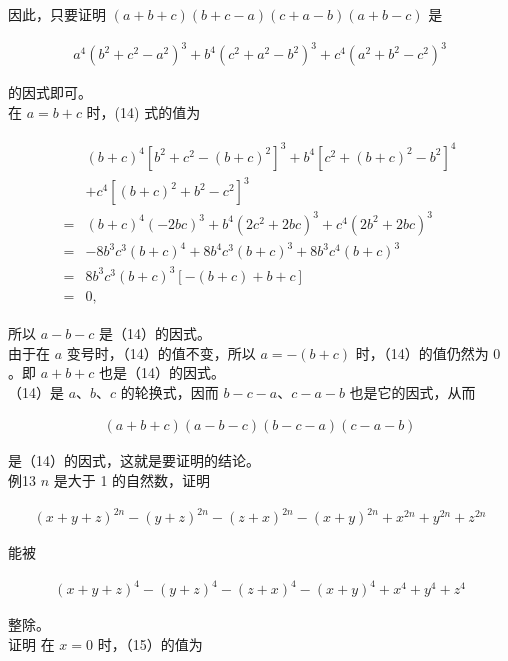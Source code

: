 \documentclass[10pt]{article}
\begin{document}
因此，只要证明 $(a+b+c)(b+c-a)(c+a-b)(a+b-c)$ 是

\begin{align*}
a^{4}\left(b^{2}+c^{2}-a^{2}\right)^{3}+b^{4}\left(c^{2}+a^{2}-b^{2}\right)^{3}+c^{4}\left(a^{2}+b^{2}-c^{2}\right)^{3} \tag{14}
\end{align*}

的因式即可。\\
在 $a=b+c$ 时，(14) 式的值为

\begin{align*}
\begin{aligned}
& (b+c)^{4}\left[b^{2}+c^{2}-(b+c)^{2}\right]^{3}+b^{4}\left[c^{2}+(b+c)^{2}-b^{2}\right]^{4} \\
& +c^{4}\left[(b+c)^{2}+b^{2}-c^{2}\right]^{3} \\
= & (b+c)^{4}(-2 b c)^{3}+b^{4}\left(2 c^{2}+2 b c\right)^{3}+c^{4}\left(2 b^{2}+2 b c\right)^{3} \\
= & -8 b^{3} c^{3}(b+c)^{4}+8 b^{4} c^{3}(b+c)^{3}+8 b^{3} c^{4}(b+c)^{3} \\
= & 8 b^{3} c^{3}(b+c)^{3}[-(b+c)+b+c] \\
= & 0,
\end{aligned}
\end{align*}

所以 $a-b-c$ 是（14）的因式。\\
由于在 $a$ 变号时，（14）的值不变，所以 $a=-(b+c)$ 时，（14）的值仍然为 0 。即 $a+b+c$ 也是（14）的因式。\\
（14）是 $a 、 b 、 c$ 的轮换式，因而 $b-c-a 、 c-a-b$ 也是它的因式，从而

\begin{align*}
(a+b+c)(a-b-c)(b-c-a)(c-a-b)
\end{align*}

是（14）的因式，这就是要证明的结论。\\
例13 $n$ 是大于 1 的自然数，证明

\begin{align*}
(x+y+z)^{2 n}-(y+z)^{2 n}-(z+x)^{2 n}-(x+y)^{2 n}+x^{2 n}+y^{2 n}+z^{2 n} \tag{15}
\end{align*}

能被

\begin{align*}
(x+y+z)^{4}-(y+z)^{4}-(z+x)^{4}-(x+y)^{4}+x^{4}+y^{4}+z^{4} \tag{16}
\end{align*}

整除。\\
证明 在 $x=0$ 时，（15）的值为
\end{document}
